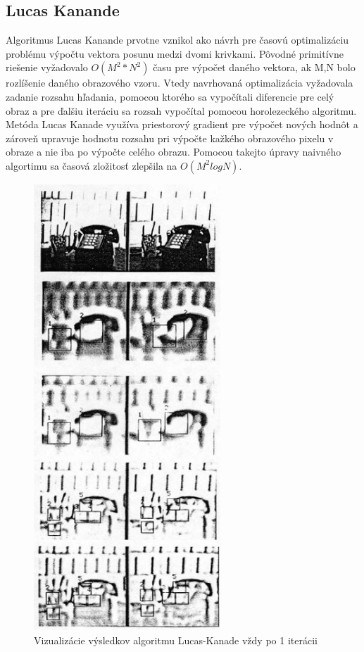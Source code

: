 \subsection{Lucas Kanande}
Algoritmus Lucas Kanande prvotne vznikol ako návrh pre časovú optimalizáciu problému výpočtu vektora posunu medzi dvomi krivkami.
Pôvodné primitívne riešenie vyžadovalo \begin{math} O(M^2 * N^2) \end{math} času pre výpočet daného vektora, ak M,N bolo rozlíšenie daného obrazového vzoru.
Vtedy navrhovaná optimalizácia vyžadovala zadanie rozsahu hľadania, pomocou ktorého sa vypočítali diferencie pre celý obraz a pre ďalšiu iteráciu sa rozsah vypočítal pomocou horolezeckého algoritmu.
Metóda Lucas Kanade využíva priestorový gradient pre výpočet nových hodnôt a zároveň upravuje hodnotu rozsahu pri výpočte kažkého obrazového pixelu v obraze a nie iba po výpočte celého obrazu.
Pomocou takejto úpravy naivného algortimu sa časová zložitosť zlepšila na \begin{math} O(M^2 log N) \end{math}\cite{lucas-kanade}.

\begin{figure}[H]
  \centering
  \includegraphics[width=7cm]{pics/lukas-kanade.jpg}
  \caption{Vizualizácie výsledkov algoritmu Lucas-Kanade vždy po 1 iterácii\cite{lucas-kanade}}
\end{figure}
\vspace{10mm}

